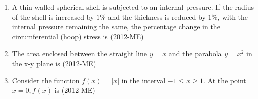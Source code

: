 \documentclass[journal,12pt,twocolumn]{IEEEtran}
\theoremstyle{remark}
\begin{document}
\begin{enumerate}
\item A thin walled spherical shell is subjected to an internal pressure. If the radius of the shell is increased by $1\%$ and the thickness is reduced by $1\%$, with the internal pressure remaining the same, the percentage change in the circumferential (hoop) stress is \hfill{(2012-ME)} 
  \begin{enumerate} 
  \end{enumerate}


\item The area enclosed between the straight line $y = x$ and the parabola $y = x^{2}$ in the x-y plane is \hfill{(2012-ME)} 
                 \begin{enumerate}   
                         \end{enumerate}



\item Consider the function $f(x)=|x|$ in the interval $-1\leq x \geq 1$. At the point $x = 0, f(x)$ is \hfill{(2012-ME)} 
                 \begin{enumerate}   
		     \end{enumerate}


\end{enumerate}
\end{document}
